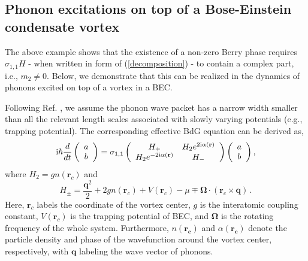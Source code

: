 \documentclass[pra,epsfig,rotate,superscriptaddress,showpacs]{revtex4}
\begin{document}
\subsection{Phonon excitations on top of a Bose-Einstein condensate vortex}

The above example shows that the existence of a non-zero Berry phase requires $\sigma_{1,1}H$ - when written in form of (\ref{decomposition}) - to contain a complex part, i.e., $m_2\neq0$. Below, we demonstrate that this can be realized in the dynamics of phonons excited on top of a vortex in a BEC.

Following Ref.  \cite{ZhangNiu}, we assume the phonon wave packet has a narrow width smaller than all the relevant length scales associated with slowly varying potentials (e.g., trapping potential). The corresponding effective BdG equation can be derived as,
\begin{eqnarray}
{\text i}\hbar\frac{d}{dt}\left(\begin{array}{c}a \\b\end{array} \right)=\sigma_{1,1} \left(\begin{array}{cc}H_+&H_2 e^{2{\text i}\alpha(\mathbf{r})} \\ H_2 e^{-2{\text i}\alpha(\mathbf{r})}&H_-\end{array} \right) \left(\begin{array}{c}a \\b\end{array} \right), \label{eq:Phonon}
\end{eqnarray}
where $H_2=gn(\mathbf{r}_c)$ and
\begin{equation}
H_{\pm}=\frac{\mathbf{q}^2}{2}+2gn(\mathbf{r}_c)+V(\mathbf{r}_c)-\mu\mp \mathbf{\Omega}\cdot(\mathbf{r}_c\times\mathbf{q})\,.
\end{equation}
Here, $\mathbf{r}_c$ labels the coordinate of the vortex center, $g$ is the interatomic coupling constant, $V(\mathbf{r}_c)$ is the trapping potential of BEC, and $\mathbf{\Omega}$ is the rotating frequency of the whole system. Furthermore, $n(\mathbf{r_c})$ and $\alpha(\mathbf{r_c})$ denote the particle density and phase of the wavefunction around the vortex center, respectively, with $\mathbf{q}$ labeling the wave vector of phonons.
\end{document}
